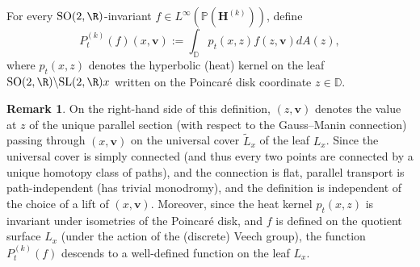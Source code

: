 \documentclass[JEP,XML,SOM,Unicode,published]{cedram}
\theoremstyle{plain}
\theoremstyle{definition}
\newtheorem{rem}[thm]{Remark}
\numberwithin{equation}{subsection}
\newcommand\bD{\mathbb{D}}
\newcommand\bP{\mathbb{P}}
\newcommand{\SL}{\mathrm{SL}}
\newcommand{\SO}{\mathrm{SO}}
\newcommand{\bfH}{\boldsymbol{H}}
\newcommand{\bfv}{\boldsymbol{v}}
\begin{document}
For every $\SO(2, \R)$-invariant $f \in L^\infty(\bP(\bfH^{(k)}))$, define
\[
P^{(k)}_t(f) (x,\bfv) := \int_{\bD} p_t(x,z) f(z,\bfv) dA(z),
\]
where $p_t(x,z)$ denotes the hyperbolic (heat) kernel
on the leaf $\SO(2, \R) \backslash \SL(2,\R)x$ written on the Poincaré disk coordinate $z \in \bD$.
\begin{rem} On the right-hand side of this definition, $(z, \bfv)$ denotes the value at $z$ of the unique parallel section (with respect to the Gauss--Manin connection) passing through $(x, \bfv)$ on the universal cover $\widetilde{L}_x$ of the leaf $L_x$. Since the universal cover is simply connected (and thus every two points are connected by a unique homotopy class of paths), and the connection is flat, parallel transport is path-independent (\ie has trivial monodromy), and the definition is independent of the choice of a lift of \((x, \bfv)\). Moreover, since the heat kernel \(p_t(x, z)\) is invariant under isometries of the Poincaré disk, and $f$ is defined on the quotient surface $L_x$ (under the action of the (discrete) Veech group), the function $P_t^{(k)}(f)$ descends to a well-defined function on the leaf $L_x$.
\end{rem}
\end{document}
